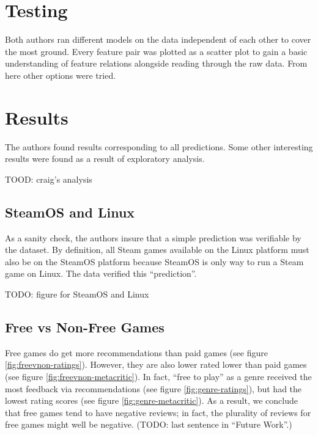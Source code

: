 \documentclass[letterpaper,10pt,twocolumn]{article}
\begin{document}

\section{Testing}

Both authors ran different models on the data independent of each other to
cover the most ground. Every feature pair was plotted as a scatter plot to
gain a basic understanding of feature relations alongside reading through the
raw data. From here other options were tried.



\section{Results}

The authors found results corresponding to all predictions. Some other interesting
results were found as a result of exploratory analysis.

TOOD: craig's analysis

\subsection{SteamOS and Linux}

As a sanity check, the authors insure that a simple prediction was verifiable
by the dataset. By definition, all Steam games available on the Linux platform
must also be on the SteamOS platform because SteamOS is only way to run a Steam
game on Linux. The data verified this ``prediction''.

TODO: figure for SteamOS and Linux

\subsection{Free vs Non-Free Games}

Free games do get more recommendations than paid games (see figure
\ref{fig:freevnon-ratings}). However, they are also lower rated lower than paid
games (see figure \ref{fig:freevnon-metacritic}). In fact, ``free to play'' as a
genre received the most feedback via recommendations (see figure
\ref{fig:genre-ratings}), but had the lowest rating scores (see figure
\ref{fig:genre-metacritic}). As a result, we conclude that free games tend to
have negative reviews; in fact, the plurality of reviews for free games might
well be negative. (TODO: last sentence in ``Future Work''.)
\end{document}
